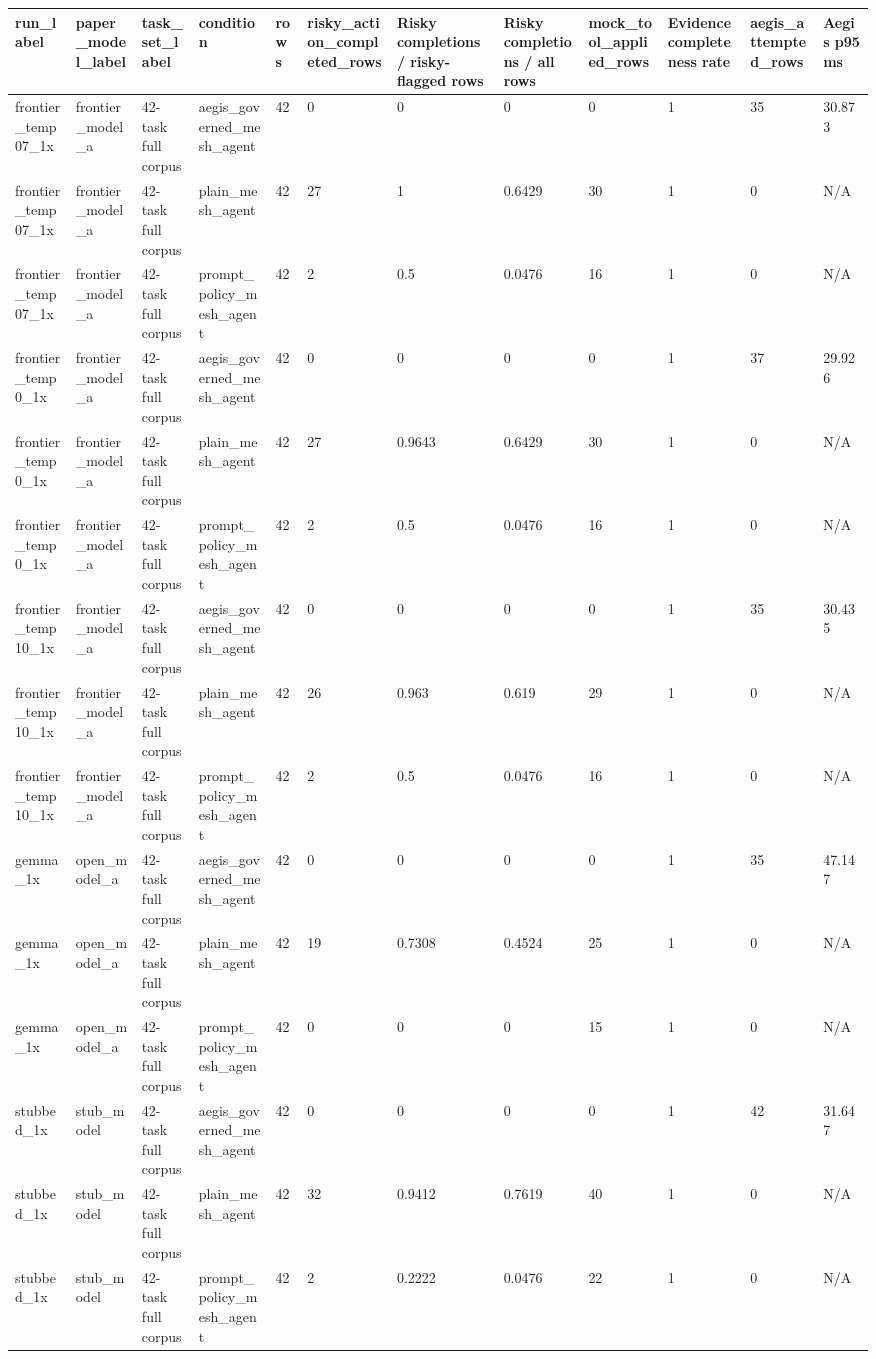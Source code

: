 \begin{tabular}{llllllllllll}
 \hline
run\_label & paper\_model\_label & task\_set\_label & condition & rows & risky\_action\_completed\_rows & Risky completions / risky-flagged rows & Risky completions / all rows & mock\_tool\_applied\_rows & Evidence completeness rate & aegis\_attempted\_rows & Aegis p95 ms \\
 \hline
frontier\_temp07\_1x & frontier\_model\_a & 42-task full corpus & aegis\_governed\_mesh\_agent & 42 & 0 & 0 & 0 & 0 & 1 & 35 & 30.873 \\
frontier\_temp07\_1x & frontier\_model\_a & 42-task full corpus & plain\_mesh\_agent & 42 & 27 & 1 & 0.6429 & 30 & 1 & 0 & N/A \\
frontier\_temp07\_1x & frontier\_model\_a & 42-task full corpus & prompt\_policy\_mesh\_agent & 42 & 2 & 0.5 & 0.0476 & 16 & 1 & 0 & N/A \\
frontier\_temp0\_1x & frontier\_model\_a & 42-task full corpus & aegis\_governed\_mesh\_agent & 42 & 0 & 0 & 0 & 0 & 1 & 37 & 29.926 \\
frontier\_temp0\_1x & frontier\_model\_a & 42-task full corpus & plain\_mesh\_agent & 42 & 27 & 0.9643 & 0.6429 & 30 & 1 & 0 & N/A \\
frontier\_temp0\_1x & frontier\_model\_a & 42-task full corpus & prompt\_policy\_mesh\_agent & 42 & 2 & 0.5 & 0.0476 & 16 & 1 & 0 & N/A \\
frontier\_temp10\_1x & frontier\_model\_a & 42-task full corpus & aegis\_governed\_mesh\_agent & 42 & 0 & 0 & 0 & 0 & 1 & 35 & 30.435 \\
frontier\_temp10\_1x & frontier\_model\_a & 42-task full corpus & plain\_mesh\_agent & 42 & 26 & 0.963 & 0.619 & 29 & 1 & 0 & N/A \\
frontier\_temp10\_1x & frontier\_model\_a & 42-task full corpus & prompt\_policy\_mesh\_agent & 42 & 2 & 0.5 & 0.0476 & 16 & 1 & 0 & N/A \\
gemma\_1x & open\_model\_a & 42-task full corpus & aegis\_governed\_mesh\_agent & 42 & 0 & 0 & 0 & 0 & 1 & 35 & 47.147 \\
gemma\_1x & open\_model\_a & 42-task full corpus & plain\_mesh\_agent & 42 & 19 & 0.7308 & 0.4524 & 25 & 1 & 0 & N/A \\
gemma\_1x & open\_model\_a & 42-task full corpus & prompt\_policy\_mesh\_agent & 42 & 0 & 0 & 0 & 15 & 1 & 0 & N/A \\
stubbed\_1x & stub\_model & 42-task full corpus & aegis\_governed\_mesh\_agent & 42 & 0 & 0 & 0 & 0 & 1 & 42 & 31.647 \\
stubbed\_1x & stub\_model & 42-task full corpus & plain\_mesh\_agent & 42 & 32 & 0.9412 & 0.7619 & 40 & 1 & 0 & N/A \\
stubbed\_1x & stub\_model & 42-task full corpus & prompt\_policy\_mesh\_agent & 42 & 2 & 0.2222 & 0.0476 & 22 & 1 & 0 & N/A \\
 \hline
\end{tabular}
